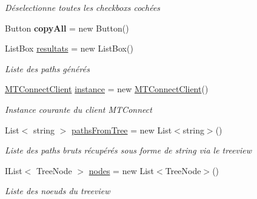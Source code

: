 \begin{DoxyCompactItemize}
\begin{DoxyCompactList}\small\item\em Déselectionne toutes les checkboxs cochées \end{DoxyCompactList}\item 
\mbox{\label{class_m_t_connect_agent_1_1_user_control_display_tab_aa15d70b2eb99ccc3c793590fa01d6881}} 
Button {\bfseries copy\+All} = new Button()
\item 
List\+Box \mbox{\hyperlink{class_m_t_connect_agent_1_1_user_control_display_tab_a083da92870ac6aad4307ae14a32bc561}{resultats}} = new List\+Box()
\begin{DoxyCompactList}\small\item\em Liste des paths générés \end{DoxyCompactList}\item 
\mbox{\hyperlink{class_m_t_connect_agent_1_1_b_l_l_1_1_m_t_connect_client}{M\+T\+Connect\+Client}} \mbox{\hyperlink{class_m_t_connect_agent_1_1_user_control_display_tab_a4bfdc2032bbe24566e9e4d7053438ab1}{instance}} = new \mbox{\hyperlink{class_m_t_connect_agent_1_1_b_l_l_1_1_m_t_connect_client}{M\+T\+Connect\+Client}}()
\begin{DoxyCompactList}\small\item\em Instance courante du client M\+T\+Connect \end{DoxyCompactList}\item 
List$<$ string $>$ \mbox{\hyperlink{class_m_t_connect_agent_1_1_user_control_display_tab_aefd62ca9c1f8ff816f6208332ae4860e}{paths\+From\+Tree}} = new List$<$string$>$()
\begin{DoxyCompactList}\small\item\em Liste des paths bruts récupérés sous forme de string via le treeview \end{DoxyCompactList}\item 
I\+List$<$ Tree\+Node $>$ \mbox{\hyperlink{class_m_t_connect_agent_1_1_user_control_display_tab_a70ccdb75ebd47abf8cf75656c5318492}{nodes}} = new List$<$Tree\+Node$>$()
\begin{DoxyCompactList}\small\item\em Liste des noeuds du treeview \end{DoxyCompactList}\item 
\mbox{\label{class_m_t_connect_agent_1_1_user_control_display_tab_a3471dd7677ae1037fe9319383ef5ccbd}} 

\end{DoxyCompactItemize}
